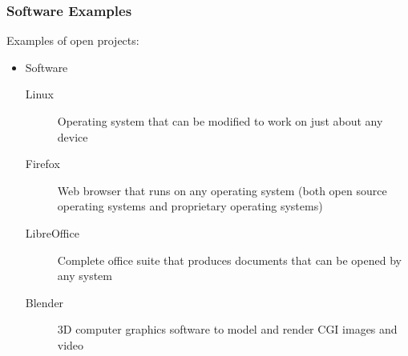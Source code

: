 \documentclass{beamer}
\begin{document}
\begin{frame}
  \frametitle{Software Examples}
  Examples of open projects:

  \begin{itemize}
  \item Software
    \begin{description}
    \item[Linux] Operating system that can be modified to work on just
      about any device
    \item[Firefox] Web browser that runs on any operating system (both
      open source operating systems and proprietary operating systems)
    \item[LibreOffice] Complete office suite that produces documents
      that can be opened by any system
    \item[Blender] 3D computer graphics software to model and render CGI images and video
    \end{description}
    \end{itemize}
\end{frame}
\end{document}
